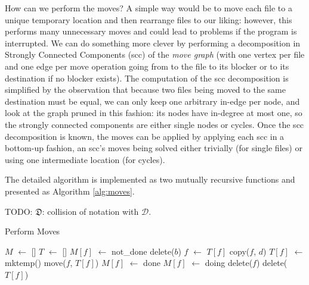 \documentclass[11pt]{llncs}
\newcommand*\Let[2]{\State #1 $\gets$ #2}
\newcommand{\SetD}{\mathcal{D}}
\begin{document}
How can we perform the moves? A simple way would be to move each file to a unique temporary location and then rearrange files to our liking: however, this performs many unnecessary moves and could lead to problems if the program is interrupted. We can do something more clever by performing a decomposition in Strongly Connected Components ({\sc scc}) of the \textit{move graph} (with one vertex per file and one edge per move operation going from to the file to its blocker or to its destination if no blocker exists). The computation of the {\sc scc} decomposition is simplified by the observation that because two files being moved to the same destination must be equal, we can only keep one arbitrary in-edge per node, and look at the graph pruned in this fashion: its nodes have in-degree at most one, so the strongly connected components are either single nodes or cycles. Once the {\sc scc} decomposition is known, the moves can be applied by applying each {\sc scc} in a bottom-up fashion, an {\sc scc}'s moves being solved either trivially (for single files) or using one intermediate location (for cycles).

The detailed algorithm is implemented as two mutually recursive functions and presented as Algorithm \ref{alg:moves}.

TODO: $\mathfrak{D}$: collision of notation with $\SetD$.

\begin{algorithm}
  \caption{Perform Moves}
  \label{alg:moves}
  \begin{algorithmic}[1]
    \Statex
    \Let{$M$}{[]}
    \Let{$T$}{[]}
      \Let{$M[f]$}{not\_done}
    \EndFor
          \State delete($b$) 
        \Else
          \State {} 
        \EndIf
      \EndIf
        \Let{$f$}{$T[f]$}
      \EndIf
      \State copy($f$, $d$)
    \EndFunction
        \State \Return {}
      \EndIf
        \Let{$T[f]$}{mktemp()}
        \State move($f$, $T[f]$)
        \Let{$M[f]$}{done}
        \State \Return {}
      \EndIf
      \Let{$M[f]$}{doing}
          \State {} 
        \EndIf
      \EndFor
        \State delete($f$)
      \EndIf
        \State delete($T[f]$)
      \EndIf
    \EndFunction

      \State {}
    \EndFor
  \end{algorithmic}
\end{algorithm}
\end{document}
